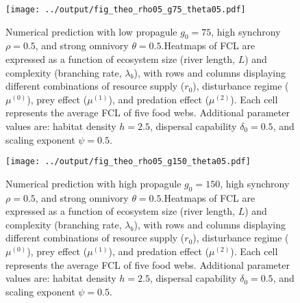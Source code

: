 \newpage

\begin{figure}
\centering
\texttt{[image: ../output/fig\_theo\_rho05\_g75\_theta05.pdf]}
\caption{\label{fig:fig-num7}Numerical prediction with low propagule
\(g_0 = 75\), high synchrony \(\rho = 0.5\), and strong omnivory
\(\theta = 0.5\).Heatmaps of FCL are expressed as a function of
ecosystem size (river length, \(L\)) and complexity (branching rate,
\(\lambda_b\)), with rows and columns displaying different combinations
of resource supply (\(r_0\)), disturbance regime (\(\mu^{(0)}\)), prey
effect (\(\mu^{(1)}\)), and predation effect (\(\mu^{(2)}\)). Each cell
represents the average FCL of five food webs. Additional parameter
values are: habitat density \(h=2.5\), dispersal capability
\(\delta_0=0.5\), and scaling exponent \(\psi=0.5\).}
\end{figure}

\newpage

\begin{figure}
\centering
\texttt{[image: ../output/fig\_theo\_rho05\_g150\_theta05.pdf]}
\caption{\label{fig:fig-num8}Numerical prediction with high propagule
\(g_0 = 150\), high synchrony \(\rho = 0.5\), and strong omnivory
\(\theta = 0.5\).Heatmaps of FCL are expressed as a function of
ecosystem size (river length, \(L\)) and complexity (branching rate,
\(\lambda_b\)), with rows and columns displaying different combinations
of resource supply (\(r_0\)), disturbance regime (\(\mu^{(0)}\)), prey
effect (\(\mu^{(1)}\)), and predation effect (\(\mu^{(2)}\)). Each cell
represents the average FCL of five food webs. Additional parameter
values are: habitat density \(h=2.5\), dispersal capability
\(\delta_0=0.5\), and scaling exponent \(\psi=0.5\).}
\end{figure}

\newpage
